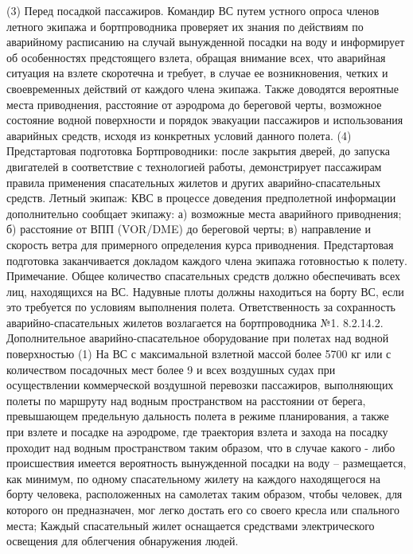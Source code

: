 (3) Перед посадкой пассажиров. Командир ВС путем устного опроса членов летного экипажа и бортпроводника проверяет их знания по действиям по аварийному расписанию на случай вынужденной посадки на воду и информирует об особенностях предстоящего взлета, обращая внимание всех, что аварийная ситуация на взлете скоротечна и требует, в случае ее возникновения, четких и своевременных действий от каждого члена экипажа. Также доводятся вероятные места приводнения, расстояние от аэродрома до береговой черты, возможное состояние водной поверхности и порядок эвакуации пассажиров и использования аварийных средств, исходя из конкретных условий данного полета.
(4) Предстартовая подготовка
Бортпроводники: после закрытия дверей, до запуска двигателей в соответствие с технологией работы, демонстрирует пассажирам правила применения спасательных жилетов и других аварийно-спасательных средств.
Летный экипаж: 
КВС в процессе доведения предполетной информации дополнительно сообщает экипажу:
а)	возможные места аварийного приводнения;
б)	расстояние от ВПП (VOR/DME) до береговой черты;
в)	направление и скорость ветра для примерного определения курса приводнения.
Предстартовая подготовка заканчивается докладом каждого члена экипажа готовностью к полету.
Примечание. Общее количество спасательных средств должно обеспечивать всех лиц, находящихся на ВС. Надувные плоты должны находиться на борту ВС, если это требуется по условиям выполнения полета. Ответственность за сохранность аварийно-спасательных жилетов возлагается на бортпроводника №1. 
8.2.14.2. Дополнительное аварийно-спасательное оборудование при полетах над водной                                         поверхностью
(1) На ВС с максимальной взлетной массой более 5700 кг или с количеством посадочных мест более 9 и всех воздушных судах при осуществлении коммерческой воздушной перевозки пассажиров, выполняющих полеты по маршруту над водным пространством на расстоянии от берега, превышающем предельную дальность полета в режиме планирования, а также при взлете и посадке на аэродроме, где траектория взлета и захода на посадку проходит над водным пространством таким образом, что в случае какого - либо происшествия имеется вероятность вынужденной посадки на воду – размещается, как минимум, по одному спасательному жилету на каждого находящегося на борту человека, расположенных на самолетах таким образом, чтобы человек, для которого он предназначен, мог легко достать его со своего кресла или спального места;
Каждый спасательный жилет оснащается средствами электрического освещения для облегчения обнаружения людей.
